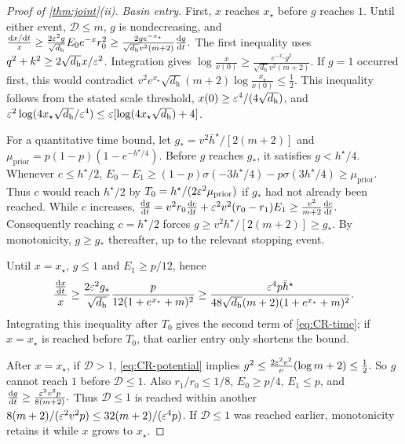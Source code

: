 \begin{proof}[Proof of \cref{thm:joint}(ii)]
\emph{Basin entry.}
First, $x$ reaches $x_\star$ before $g$ reaches $1$. Until either event, $\mathcal D\le m$, $g$ is nondecreasing, and
 $\frac{\ddt{x}}{x}\ge\frac{2\initscale^2g}{\sqrt{d_{\mathrm h}}}E_0e^{-x}r_0^2 \ge\frac{2ge^{-x_\star}}{\sqrt{d_{\mathrm h}}v^2(m+2)}\ddt{g}.$ 
The first inequality uses $q^2+k^2\ge2\sqrt{d_{\mathrm h}}x/\varepsilon^2$.
Integration gives
 $\log\frac{x}{x(0)}\ge\frac{e^{-x_\star}g^2}{\sqrt{d_{\mathrm h}}v^2(m+2)}.$ 
If $g=1$ occurred first, this would contradict
 $v^2e^{x_\star}\sqrt{d_{\mathrm h}}(m+2)\log\frac{x_\star}{x(0)}\le\frac12.$ 
This inequality follows from the stated scale threshold, $x(0)\ge\varepsilon^4/(4\sqrt{d_{\mathrm h}})$, and
$\varepsilon^2\log(4x_\star\sqrt{d_{\mathrm h}}/\varepsilon^4)\le\varepsilon[\log(4x_\star\sqrt{d_{\mathrm h}})+4]$.

For a quantitative time bound, let $g_*=v^2\bar h^\star/[2(m+2)]$ and
$\mu_{\mathrm{prior}}=p(1-p)(1-e^{-h^\star/4})$.
Before $g$ reaches $g_*$, it satisfies $g<h^\star/4$. Whenever $c\le h^\star/2$,
 $E_0-E_1\ge(1-p)\sigma(-3h^\star/4)-p\sigma(3h^\star/4)\ge\mu_{\mathrm{prior}}.$ 
Thus $c$ would reach $h^\star/2$ by $T_0=h^\star/(2\varepsilon^2\mu_{\mathrm{prior}})$ if $g_*$ had not already been reached.
While $c$ increases,
 $\ddt{g}=v^2r_0\ddt{c}+\initscale^2v^2(r_0-r_1)E_1\ge\frac{v^2}{m+2}\ddt{c}.$ 
Consequently reaching $c=h^\star/2$ forces $g\ge v^2h^\star/[2(m+2)]\ge g_*$.
By monotonicity, $g\ge g_*$ thereafter, up to the relevant stopping event.

Until $x=x_\star$, $g\le1$ and $E_1\ge p/12$, hence
\[
 \frac{\ddt{x}}{x}\ge\frac{2\initscale^2g_*}{\sqrt{d_{\mathrm h}}}
       \frac{p}{12(1+e^{x_\star}+m)^2}
 \ge\frac{\initscale^4p\bar h^\star}{48\sqrt{d_{\mathrm h}}(m+2)(1+e^{x_\star}+m)^2}.
\]
Integrating this inequality after $T_0$ gives the second term of \cref{eq:CR-time}; if $x=x_\star$ is reached before $T_0$,
that earlier entry only shortens the bound.

After $x=x_\star$, if $\mathcal D>1$, \eqref{eq:CR-potential} implies
 $g^2\le\frac{2\varepsilon^2v^2}{\nu}(\log m+2)\le\frac12.$ 
So $g$ cannot reach $1$ before $\mathcal D\le1$. Also $r_1/r_0\le1/8$, $E_0\ge p/4$, $E_1\le p$, and
 $\ddt{g}\ge\frac{\initscale^2v^2 p}{8(m+2)}.$ 
Thus $\mathcal D\le1$ is reached within another $8(m+2)/(\varepsilon^2v^2 p)\le32(m+2)/(\varepsilon^4p)$.
If $\mathcal D\le1$ was reached earlier, monotonicity retains it while $x$ grows to $x_\star$.


\end{proof}
